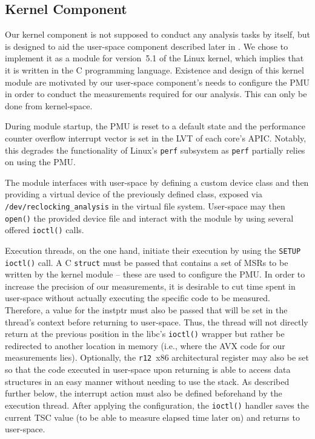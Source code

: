 \subsection{Kernel Component}
\label{sec:analysis:design:kernel}

Our kernel component is not supposed to conduct any analysis tasks by itself, but is designed to aid the user-space component described later in . We chose to implement it as a module for version~5.1 of the \gls{Linux} kernel, which implies that it is written in the C programming language. Existence and design of this kernel module are motivated by our user-space component's needs to configure the \gls{PMU} in order to conduct the measurements required for our analysis. This can only be done from kernel-space.

During module startup, the \gls{PMU} is reset to a default state and the performance counter overflow interrupt vector is set in the \gls{LVT} of each core's \gls{APIC}. Notably, this degrades the functionality of \gls{Linux}'s \texttt{perf} subsystem as \texttt{perf} partially relies on using the \gls{PMU}.

The module interfaces with user-space by defining a custom device class and then providing a virtual device of the previously defined class, exposed via \texttt{/dev/reclocking\_analysis} in the virtual file system. User-space may then \texttt{open()} the provided device file and interact with the module by using several offered \texttt{ioctl()} calls.

Execution threads, on the one hand, initiate their execution by using the \texttt{SETUP ioctl()} call. A C \texttt{struct} must be passed that contains a set of \glspl{MSR} to be written by the kernel module -- these are used to configure the \gls{PMU}. In order to increase the precision of our measurements, it is desirable to cut time spent in user-space without actually executing the specific code to be measured. Therefore, a value for the \gls{instptr} must also be passed that will be set in the thread's context before returning to user-space. Thus, the thread will not directly return at the previous position in the \gls{libc}'s \texttt{ioctl()} wrapper but rather be redirected to another location in memory (i.e., where the \gls{AVX} code for our measurements lies). Optionally, the \texttt{r12}~\gls{x86} architectural register may also be set so that the code executed in user-space upon returning is able to access data structures in an easy manner without needing to use the stack. As described further below, the interrupt action must also be defined beforehand by the execution thread. After applying the configuration, the \texttt{ioctl()} handler saves the current \gls{TSC} value (to be able to measure elapsed time later on) and returns to user-space.


